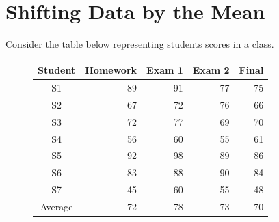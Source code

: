 \label{Stats1}


\section*{Shifting Data by the Mean}

Consider the table below representing students scores in a class.\\

\begin{figure}[h!]
\begin{center}
\begin{tabular}{|c|r|r|r|r|}
	\hline
Student & Homework & Exam 1  & Exam 2 & Final \\
\hline
S1  & 89 & 91 & 77 & 75 \\
S2  & 67 & 72 & 76 & 66 \\
S3  & 72 & 77 & 69 & 70 \\
S4  & 56 & 60 & 55 & 61 \\
S5  & 92 & 98 & 89 & 86 \\
S6  & 83 & 88 & 90 & 84 \\
S7  & 45 & 60 & 55 & 48 \\
\hline
Average  & 72 & 78 & 73 & 70\\
\hline
\end{tabular}\\
\end{center}
\end{figure}

